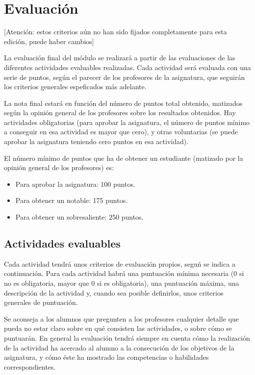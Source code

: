 \documentclass[a4paper,12pt]{article}
\begin{document}
\section{Evaluación}

[Atención: estos criterios aún no han sido fijados completamente para esta edición, puede haber cambios]

La evaluación final del módulo se realizará a partir de las evaluaciones de las diferentes actividades evaluables realizadas. Cada actividad será evaluada con una serie de puntos, según el parecer de los profesores de la asignatura, que seguirán los criterios generales espeficados más adelante.

La nota final estará en función del número de puntos total obtenido, matizados según la opinión general de los profesores sobre los resultados obtenidos. Hay actividades obligatorias (para aprobar la asignatura, el número de puntos mínimo a conseguir en esa actividad es mayor que cero), y otras voluntarias (se puede aprobar la asignatura teniendo cero puntos en esa actividad).

El número mínimo de puntos que ha de obtener un estudiante (matizado por la opinión general de los profesores) es:

\begin{itemize}
\item Para aprobar la asignatura: 100 puntos.
\item Para obtener un notable: 175 puntos.
\item Para obtener un sobresaliente: 250 puntos.
\end{itemize}

\subsection{Actividades evaluables}

Cada actividad tendrá unos criterios de evaluación propios, seguń se indica a continuación. Para cada actividad habrá una puntuación mínima necesaria (0 si no es obligatoria, mayor que 0 si es obligatoria), una puntuación máxima, una descripción de la actividad y, cuando sea posible definirlos, unos criterios generales de puntuación.

Se aconseja a los alumnos que pregunten a los profesores cualquier detalle que pueda no estar claro sobre en qué consisten las actividades, o sobre cómo se puntuarán. En general la evaluación tendrá siempre en cuenta cómo la realización de la actividad ha acercado al alumno a la consecución de los objetivos de la asignatura, y cómo éste ha mostrado las competencias o habilidades correspondientes.
\end{document}
